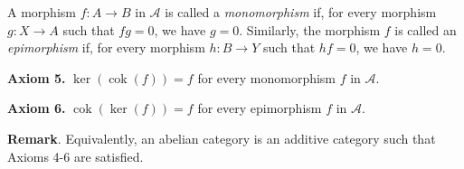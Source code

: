\documentclass[12pt]{article}
\newcommand{\A}{\mathcal{A}}
\newcommand{\cok}{\operatorname{cok}}
\begin{document}
A morphism $f\colon A \to B$ in $\A$ is called a \emph{monomorphism} if, for every morphism $g\colon X \to A$ such that $fg = 0$, we have $g=0$. Similarly, the morphism $f$ is called an \emph{epimorphism} if, for every morphism $h\colon B \to Y$ such that $hf = 0$, we have $h=0$.

\textbf{Axiom 5.} $\ker(\cok(f)) = f$ for every monomorphism $f$ in $\A$.

\textbf{Axiom 6.} $\cok(\ker(f)) = f$ for every epimorphism $f$ in $\A$.

\textbf{Remark}.  Equivalently, an abelian category is an additive category such that Axioms 4-6 are satisfied.
\end{document}
